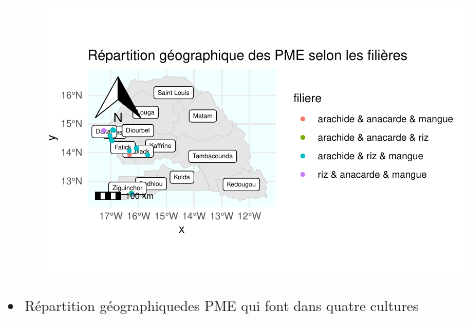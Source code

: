 \documentclass[
  letterpaper,
  DIV=11,
  numbers=noendperiod]{scrartcl}
\providecommand{\tightlist}{%
  \setlength{\itemsep}{0pt}\setlength{\parskip}{0pt}}\usepackage{longtable,booktabs,array}
\begin{document}
\begin{figure}[H]

{\centering \includegraphics{projet_R_files/figure-pdf/unnamed-chunk-44-1.pdf}

}

\end{figure}

\begin{itemize}
\tightlist
\item
  Répartition géographiquedes PME qui font dans quatre cultures
\end{itemize}
\end{document}
